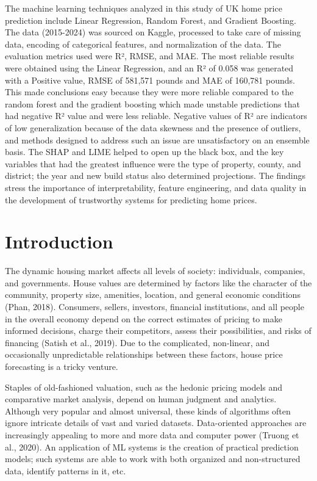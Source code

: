 \documentclass[12pt, a4paper, oneside]{book}
\begin{document}
The machine learning techniques analyzed in this study of UK home price prediction include Linear Regression, Random Forest, and Gradient Boosting. The data (2015-2024) was sourced on Kaggle, processed to take care of missing data, encoding of categorical features, and normalization of the data. The evaluation metrics used were R², RMSE, and MAE. The most reliable results were obtained using the Linear Regression, and an R² of 0.058 was generated with a Positive value, RMSE of 581,571 pounds and MAE of 160,781 pounds. This made conclusions easy because they were more reliable compared to the random forest and the gradient boosting which made unstable predictions that had negative R² value and were less reliable. Negative values of R² are indicators of low generalization because of the data skewness and the presence of outliers, and methods designed to address such an issue are unsatisfactory on an ensemble basis. The SHAP and LIME helped to open up the black box, and the key variables that had the greatest influence were the type of property, county, and district; the year and new build status also determined projections. The findings stress the importance of interpretability, feature engineering, and data quality in the development of trustworthy systems for predicting home prices.

\newpage
\tableofcontents
\newpage
\listoftables
\newpage
\listoffigures

\chapter{Introduction}\label{ch:1}

The dynamic housing market affects all levels of society: individuals, companies, and governments. House values are determined by factors like the character of the community, property size, amenities, location, and general economic conditions (Phan, 2018). Consumers, sellers, investors, financial institutions, and all people in the overall economy depend on the correct estimates of pricing to make informed decisions, charge their competitors, assess their possibilities, and risks of financing (Satish et al., 2019). Due to the complicated, non-linear, and occasionally unpredictable relationships between these factors, house price forecasting is a tricky venture.

Staples of old-fashioned valuation, such as the hedonic pricing models and comparative market analysis, depend on human judgment and analytics. Although very popular and almost universal, these kinds of algorithms often ignore intricate details of vast and varied datasets. Data-oriented approaches are increasingly appealing to more and more data and computer power (Truong et al., 2020). An application of ML systems is the creation of practical prediction models; such systems are able to work with both organized and non-structured data, identify patterns in it, etc.
\end{document}
